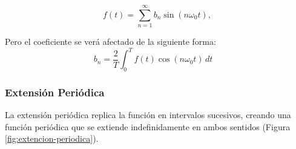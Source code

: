 \begin{equation}\label{eq34}
	f(t) =\sum_{n=1}^{\infty}  b_n \sin(n\omega_0 t),
\end{equation}

Pero el coeficiente se verá afectado de la siguiente forma: ~\cite{fourierCruzFierro}
\begin{equation}\label{eq35}
	b_n = \frac{2}{T} \int_{0}^{T} f(t) \cos(n\omega_0 t) \, dt \quad 
\end{equation}


\subsubsection{Extensión Periódica}
La extensión periódica replica la función en intervalos sucesivos, creando una función periódica que se extiende indefinidamente en ambos sentidos (Figura \ref{fig:extencion-periodica}).

